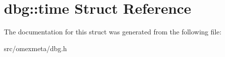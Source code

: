 \hypertarget{structdbg_1_1time}{}\section{dbg\+:\+:time Struct Reference}
\label{structdbg_1_1time}


The documentation for this struct was generated from the following file\+:\begin{DoxyCompactItemize}
\item 
src/omexmeta/dbg.\+h\end{DoxyCompactItemize}
